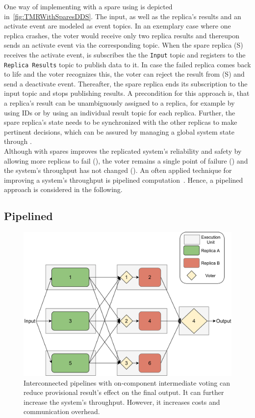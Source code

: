 One way of implementing  with a spare using  is depicted in~\autoref{fig:TMRWithSparesDDS}.
The input, as well as the replica's results and an activate event are modeled as  event topics.
In an exemplary case where one replica crashes, the voter would receive only two replica results and thereupon sends an activate event via the corresponding topic.
When the spare replica (S) receives the activate event, is subscribes the the \texttt{Input} topic and registers to the \texttt{Replica Results} topic to publish data to it.
In case the failed replica comes back to life and the voter recognizes this, the voter can reject the result from (S) and send a deactivate event.
Thereafter, the spare replica ends its subscription to the input topic and stops publishing results.
A precondition for this approach is, that a replica's result can be unambiguously assigned to a replica, for example by using IDs or by using an individual result topic for each replica.
Further, the spare replica's state needs to be synchronized with the other replicas to make pertinent decisions, which can be assured by managing a global system state through .
\\

Although  with spares improves the replicated system's reliability and safety by allowing more replicas to fail (\ChallengeWR), the voter remains a single point of failure (\ChallengeVoter) and the system's throughput has not changed (\ChallengeThrough).
An often applied technique for improving a system's throughput is pipelined computation~\cite{TanenbaumSteen07}.
Hence, a pipelined  approach is considered in the following.

\subsection{Pipelined }
\begin{figure}[!hb]
	\centering
	\includegraphics[width=0.9\linewidth]{images/InterconnectedVoterPipeline}
	\caption{Interconnected pipelines with on-component intermediate voting can reduce provisional result's effect on the final output. It can further increase the system's throughput. However, it increases costs and communication overhead.}
	\label{fig:PipelineIntermediateVoters}
\end{figure}

